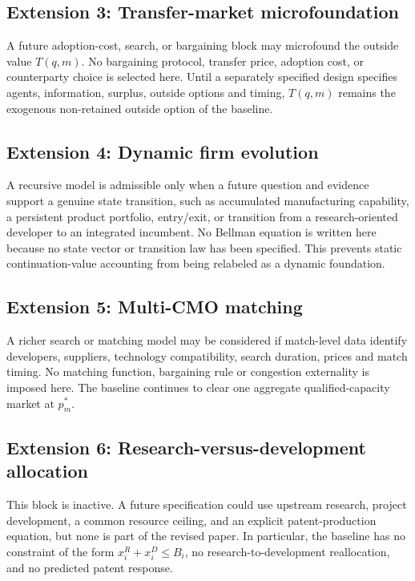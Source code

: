 \subsection{Extension 3: Transfer-market microfoundation}
\label{subsec:p11-transfer}

A future adoption-cost, search, or bargaining block may microfound the outside
value \(T(q,m)\). No bargaining protocol, transfer price, adoption cost, or
counterparty choice is selected here. Until a separately specified design
specifies agents, information, surplus, outside options and timing,
\(T(q,m)\) remains the exogenous non-retained outside option of the baseline.

\subsection{Extension 4: Dynamic firm evolution}
\label{subsec:p11-dynamics}

A recursive model is admissible only when a future question and evidence
support a genuine state transition, such as accumulated manufacturing
capability, a persistent product portfolio, entry/exit, or transition from a
research-oriented developer to an integrated incumbent. No Bellman equation is
written here because no state vector or transition law has been specified. This
prevents static continuation-value accounting from being relabeled as a
dynamic foundation.

\subsection{Extension 5: Multi-CMO matching}
\label{subsec:p11-matching}

A richer search or matching model may be considered if match-level data
identify developers, suppliers, technology compatibility, search duration,
prices and match timing. No matching function, bargaining rule or congestion
externality is imposed here. The baseline continues to clear one aggregate
qualified-capacity market at \(p_m^*\).

\subsection{Extension 6: Research-versus-development allocation}
\label{subsec:p11-research-development}

This block is inactive. A future specification could use upstream research,
project development, a common resource ceiling, and an explicit
patent-production equation, but none is part of the revised paper. In
particular, the baseline has no constraint of the form
\(x_i^R+x_i^D\leq B_i\), no research-to-development reallocation, and no
predicted patent response.

